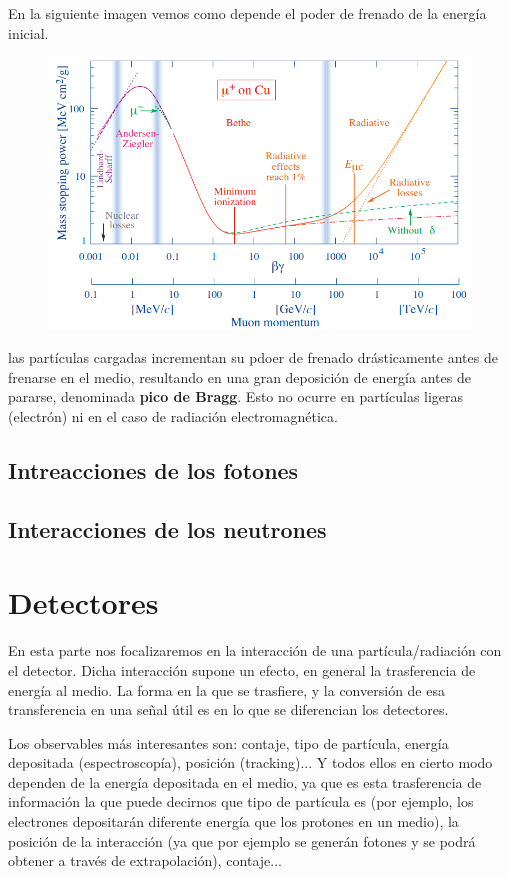 En la siguiente imagen vemos como depende el poder de frenado de la energía inicial. 

\begin{figure}[H] \centering
    \includegraphics[width=0.7\linewidth]{Cuerpo/Ch_01/Interaccion_01.png}
\end{figure}
las partículas cargadas incrementan su pdoer de frenado drásticamente antes de frenarse en el medio, resultando en una gran deposición de energía antes de pararse, denominada \textbf{pico de Bragg}. Esto no ocurre en partículas ligeras (electrón) ni en el caso de radiación electromagnética. 


     
\subsection{Intreacciones de los fotones}



\subsection{Interacciones de los neutrones}

\section{Detectores}

En esta parte nos focalizaremos en la interacción de una partícula/radiación con el detector. Dicha interacción supone un efecto, en general la trasferencia de energía al medio. La forma en la que se trasfiere, y la conversión de esa transferencia en una señal útil es en lo que se diferencian los detectores. 

Los observables más interesantes son: contaje, tipo de partícula, energía depositada (espectroscopía), posición (tracking)... Y todos ellos en cierto modo dependen de la energía depositada en el medio, ya que es esta trasferencia de información la que puede decirnos que tipo de partícula es (por ejemplo, los electrones depositarán diferente energía que los protones en un medio), la posición de la interacción (ya que por ejemplo se generán fotones y se podrá obtener a través de extrapolación), contaje... 

